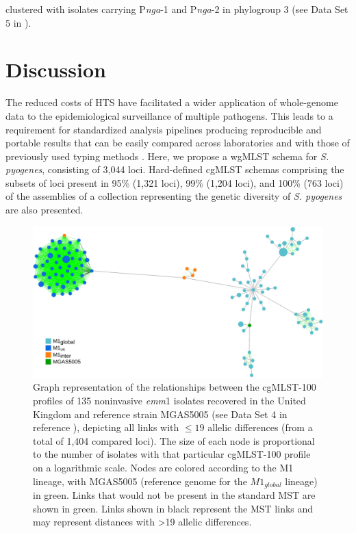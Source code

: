 clustered with isolates carrying P\textit{nga}-1 and P\textit{nga}-2 in phylogroup 3 (see Data Set 5 in \cite{friaes_supplemental_2023}).

\section{Discussion}

The reduced costs of \ac{HTS} have facilitated a wider application of whole-genome data to the epidemiological surveillance of multiple pathogens. This leads to a requirement for standardized analysis pipelines producing reproducible and portable results that can be easily compared across laboratories and with those of previously used typing methods \cite{sabat_overview_2013}. Here, we propose a \ac{wgMLST} schema for \textit{S. pyogenes}, consisting of 3,044 loci. Hard-deﬁned \ac{cgMLST} schemas comprising the subsets of loci present in 95\% (1,321 loci), 99\% (1,204 loci), and 100\% (763 loci) of the assemblies of a collection representing the genetic diversity of \textit{S. pyogenes} \cite{davies_atlas_2019} are also presented.

\begin{figure}[h!]
    \centering
    \includegraphics[width=\textwidth]{figures/chapter 4/Figure5.pdf}
    \caption{Graph representation of the relationships between the cgMLST-100 proﬁles of 135 noninvasive \textit{emm}1 isolates recovered in the United Kingdom \cite{lynskey_emergence_2019} and reference strain MGAS5005 (see Data Set 4 in reference \cite{friaes_supplemental_2023}), depicting all links with $\leq19$ allelic differences (from a total of 1,404 compared loci). The size of each node is proportional to the number of isolates with that particular cgMLST-100 proﬁle on a logarithmic scale. Nodes are colored according to the M1 lineage, with MGAS5005 (reference genome for the $M1_{global}$ lineage) in green. Links that would not be present in the standard \ac{MST} are shown in green. Links shown in black represent the \ac{MST} links and may represent distances with >19 allelic differences.}
    \label{fig:chap4_figure5}
\end{figure}

